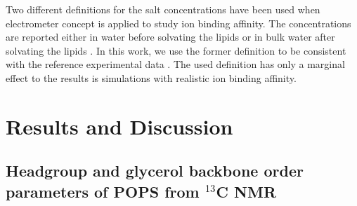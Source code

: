 \documentclass[aps,prl,superscriptaddress,twocolumn]{revtex4}
\begin{document}
Two different definitions for the salt concentrations have been used when
electrometer concept is applied to study ion binding affinity.
The concentrations are reported either in water before solvating the lipids \cite{akutsu81,roux90,catte16}
or in bulk water after solvating the lipids \cite{altenbach84,melcr18}.
In this work, we use the former definition to be consistent with the reference
experimental data \cite{roux90}. The used definition has only a marginal effect
to the results is simulations with realistic ion binding affinity.

\section{Results and Discussion}

\subsection{Headgroup and glycerol backbone order parameters of POPS from $^{13}$C NMR}
\end{document}
